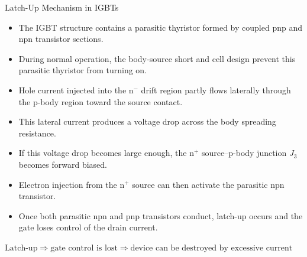 \begin{frame}{Latch-Up Mechanism in IGBTs}
\begin{itemize}
    \item The IGBT structure contains a parasitic thyristor formed by coupled pnp and npn transistor sections.
    \item During normal operation, the body-source short and cell design prevent this parasitic thyristor from turning on.
    \item Hole current injected into the n$^-$ drift region partly flows laterally through the p-body region toward the source contact.
    \item This lateral current produces a voltage drop across the body spreading resistance.
    \item If this voltage drop becomes large enough, the n$^+$ source--p-body junction $J_3$ becomes forward biased.
    \item Electron injection from the n$^+$ source can then activate the parasitic npn transistor.
    \item Once both parasitic npn and pnp transistors conduct, latch-up occurs and the gate loses control of the drain current.
\end{itemize}

$\text{Latch-up} \Rightarrow \text{gate control is lost} \Rightarrow \text{device can be destroyed by excessive current}$
\end{frame}


